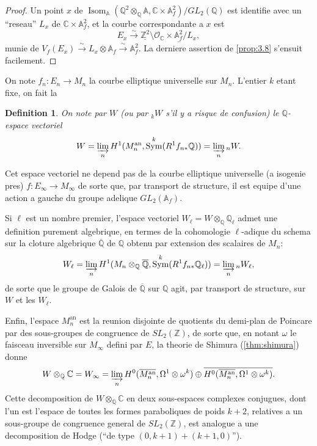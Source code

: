 \documentclass[11pt,reqno]{amsart}
\theoremstyle{plain}
\newtheorem{definition}[theorem]{Definition}
\theoremstyle{remark}
\DeclareMathOperator{\Sym}{Sym}
\DeclareMathOperator{\Isom}{Isom}
\newcommand{\shO}{\mathcal{O}}
\newcommand{\Z}{\mathbb{Z}}
\newcommand{\Q}{\mathbb{Q}}
\newcommand{\C}{\mathbb{C}}
\newcommand{\A}{\mathbb{A}}
\newcommand{\isom}{\xrightarrow{\sim}}
\numberwithin{equation}{section}
\begin{document}
\begin{proof}
Un point $x$ de $\Isom_{\A}(\Q^2 \otimes_\Q \A, \C \times \A_f^2) / GL_2(\Q)$ est identifie avec un ``reseau'' $L_x$ de $\C \times \A_f^2$, et la courbe correspondante a $x$ est
\[
E_x \isom \underline{\Z^2} \setminus \shO_\C \times \underline{\A_f^2} / L_x,
\]
munie de $V_f(E_x) \isom L_x \otimes \A_f \isom \A_f^2$. La derniere assertion de \ref{prop:3.8} s'ensuit facilement.
\end{proof}

On note $f_n: E_n \to M_n$ la courbe elliptique universelle sur $M_n$. L'entier $k$ etant fixe, on fait la

\begin{definition}\label{def:3.9}
On note par $W$ (ou par ${}_kW$ s'il y a risque de confusion) le $\Q$-espace vectoriel
\[
W = \varinjlim_n H^1(M_n^{\text{an}}, \Sym^k(R^1f_{n*}\Q)) = \varinjlim_n {}_nW.
\]
\end{definition}

Cet espace vectoriel ne depend pas de la courbe elliptique universelle (a isogenie pres) $f: E_\infty \to M_\infty$ de sorte que, par transport de structure, il est equipe d'une action a gauche du groupe adelique $GL_2(\A_f)$.

Si $\ell$ est un nombre premier, l'espace vectoriel $W_\ell = W \otimes_\Q \Q_\ell$ admet une definition purement algebrique, en termes de la cohomologie $\ell$-adique du schema sur la cloture algebrique $\overline{\Q}$ de $\Q$ obtenu par extension des scalaires de $M_n$:
\begin{equation}\label{eq:3.10}
W_\ell = \varinjlim_n H^1(M_n \otimes_\Q \overline{\Q}, \Sym^k(R^1f_{n*}\Q_\ell)) = \varinjlim_n {}_nW_\ell,
\end{equation}
de sorte que le groupe de Galois de $\overline{\Q}$ sur $\Q$ agit, par transport de structure, sur $W$ et les $W_\ell$.

Enfin, l'espace $M_n^{\text{an}}$ est la reunion disjointe de quotients du demi-plan de Poincare par des sous-groupes de congruence de $SL_2(\Z)$, de sorte que, en notant $\omega$ le faisceau inversible sur $M_\infty$ defini par $E$, la theorie de Shimura (\ref{thm:shimura}) donne
\begin{equation}\label{eq:3.11}
W \otimes_\Q \C = W_\infty = \varinjlim_n H^0(\overline{M_n^{\text{an}}}, \Omega^1 \otimes \omega^k) \oplus \overline{H^0(\overline{M_n^{\text{an}}}, \Omega^1 \otimes \omega^k)}.
\end{equation}
Cette decomposition de $W \otimes_\Q \C$ en deux sous-espaces complexes conjugues, dont l'un est l'espace de toutes les formes paraboliques de poids $k+2$, relatives a un sous-groupe de congruence general de $SL_2(\Z)$, est analogue a une decomposition de Hodge (``de type $(0, k+1) + (k+1, 0)$'').
\end{document}
